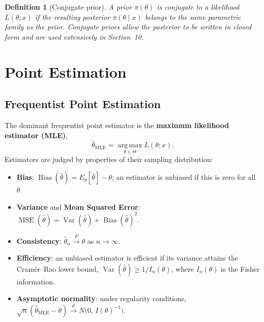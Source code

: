 \documentclass[11pt,a4paper]{article}
\newtheorem{definition}{Definition}[section]
\begin{document}
\begin{definition}[Conjugate prior]
A prior $\pi(\theta)$ is \emph{conjugate} to a likelihood $L(\theta;x)$ if the resulting posterior $\pi(\theta\mid x)$ belongs to the same parametric family as the prior. Conjugate priors allow the posterior to be written in closed form and are used extensively in Section~10.
\end{definition}

\section{Point Estimation}

\subsection{Frequentist Point Estimation}
The dominant frequentist point estimator is the \textbf{maximum likelihood estimator (MLE)},
\begin{equation}
\hat\theta_{\text{MLE}} = \operatorname*{arg\,max}_{\theta \in \Theta} L(\theta; x).
\end{equation}
Estimators are judged by properties of their sampling distribution:
\begin{itemize}[leftmargin=2em]
  \item \textbf{Bias}: $\operatorname{Bias}(\hat\theta) = E_\theta[\hat\theta] - \theta$; an estimator is unbiased if this is zero for all $\theta$.
  \item \textbf{Variance} and \textbf{Mean Squared Error}: $\operatorname{MSE}(\hat\theta) = \operatorname{Var}(\hat\theta) + \operatorname{Bias}(\hat\theta)^2$.
  \item \textbf{Consistency}: $\hat\theta_n \xrightarrow{P} \theta$ as $n \to \infty$.
  \item \textbf{Efficiency}: an unbiased estimator is efficient if its variance attains the Cram\'er--Rao lower bound, $\operatorname{Var}(\hat\theta) \ge 1/I_n(\theta)$, where $I_n(\theta)$ is the Fisher information.
  \item \textbf{Asymptotic normality}: under regularity conditions, $\sqrt{n}(\hat\theta_{\text{MLE}} - \theta) \xrightarrow{d} N\!\big(0,\, I(\theta)^{-1}\big)$.
\end{itemize}
\end{document}
